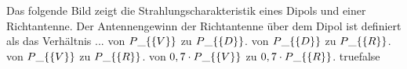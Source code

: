     {Das folgende Bild zeigt die Strahlungscharakteristik eines Dipols und einer Richtantenne. Der Antennengewinn der Richtantenne über dem Dipol ist definiert als das Verhältnis ...}
    {von $P\_\{\textrm\{V\}\}$ zu $P\_\{\textrm\{D\}\}$.}
    {von $P\_\{\textrm\{D\}\}$ zu $P\_\{\textrm\{R\}\}$.}
    {von $P\_\{\textrm\{V\}\}$ zu $P\_\{\textrm\{R\}\}$.}
    {von $0,7 \cdot P\_\{\textrm\{V\}\}$ zu $0,7 \cdot P\_\{\textrm\{R\}\}$.}
    {true}{false}